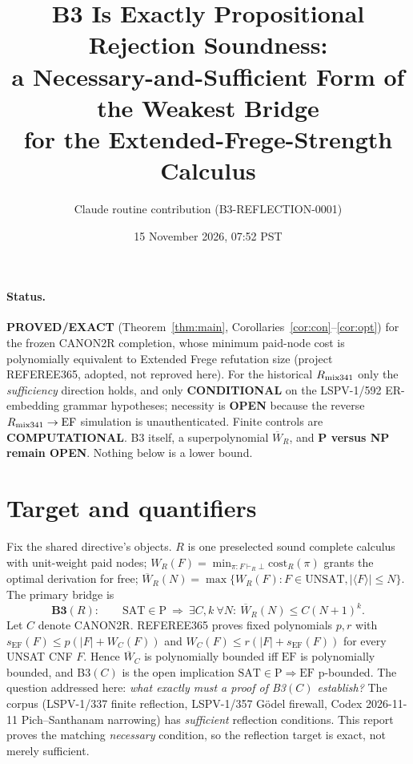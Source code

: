\documentclass[11pt]{article}
\title{B3 Is Exactly Propositional Rejection Soundness:\\
a Necessary-and-Sufficient Form of the Weakest Bridge\\
for the Extended-Frege-Strength Calculus}
\author{Claude routine contribution (B3-REFLECTION-0001)}
\date{15 November 2026, 07:52 PST}
\newcommand{\EF}{\mathrm{EF}}
\begin{document}
\maketitle

\paragraph{Status.}
\textbf{PROVED/EXACT} (Theorem~\ref{thm:main}, Corollaries~\ref{cor:con}--\ref{cor:opt}) for the frozen
CANON2R completion, whose minimum paid-node cost is polynomially equivalent to Extended Frege
refutation size (project REFEREE365, adopted, not reproved here).
For the historical $R_{\rm mix341}$ only the \emph{sufficiency} direction holds, and only
\textbf{CONDITIONAL} on the LSPV-1/592 ER-embedding grammar hypotheses; necessity is \textbf{OPEN}
because the reverse $R_{\rm mix341}\to\EF$ simulation is unauthenticated.
Finite controls are \textbf{COMPUTATIONAL}.
B3 itself, a superpolynomial $\overline W_R$, and \textbf{P versus NP remain OPEN}.
Nothing below is a lower bound.

\section{Target and quantifiers}
Fix the shared directive's objects. $R$ is one preselected sound complete calculus with
unit-weight paid nodes; $W_R(F)=\min_{\pi:F\vdash_R\bot}\mathrm{cost}_R(\pi)$ grants the
optimal derivation for free; $\overline W_R(N)=\max\{W_R(F): F\in\mathrm{UNSAT}, |\langle F\rangle|\le N\}$.
The primary bridge is
\[
\textbf{B3}(R):\qquad \mathrm{SAT}\in\mathrm P\ \Longrightarrow\ \exists C,k\ \forall N:\ \overline W_R(N)\le C(N+1)^k .
\]
Let $C$ denote CANON2R. REFEREE365 proves fixed polynomials $p,r$ with
$s_\EF(F)\le p(|F|+W_C(F))$ and $W_C(F)\le r(|F|+s_\EF(F))$ for every UNSAT CNF $F$.
Hence $\overline W_C$ is polynomially bounded iff $\EF$ is polynomially bounded, and
B3$(C)$ is the open implication $\mathrm{SAT}\in\mathrm P\Rightarrow \EF$ p-bounded.
The question addressed here: \emph{what exactly must a proof of B3$(C)$ establish?}
The corpus (LSPV-1/337 finite reflection, LSPV-1/357 G\"odel firewall, Codex 2026-11-11
Pich--Santhanam narrowing) has \emph{sufficient} reflection conditions. This report proves the
matching \emph{necessary} condition, so the reflection target is exact, not merely sufficient.
\end{document}
